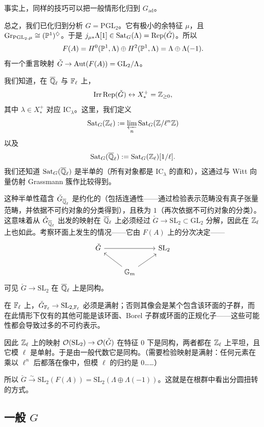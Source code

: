 \begin{remark}
事实上，同样的技巧可以把一般情形化归到 $G_{\mathrm{ad}}$。
\end{remark}

总之，我们已化归到分析 $G=\mathrm{PGL}_2$。它有极小的余特征 $\mu$，且 $\mathrm{Gr}_{\mathrm{PGL}_2,\mu}\cong(\mathbb{P}^1)^{\diamondsuit}$。于是 $j_{\mu*}\Lambda[1]\in\mathrm{Sat}_G(\Lambda)=\operatorname{Rep}(\check G)$。所以
\[
F(A)=H^0(\mathbb{P}^1,\Lambda)\oplus H^2(\mathbb{P}^1,\Lambda)=\Lambda\oplus\Lambda(-1).
\]
有一个重言映射 $\check G\to\operatorname{Aut}(F(A))=\mathrm{GL}_2/\Lambda$。


我们知道，在 $\overline{\mathbb{Q}}_\ell$ 与 $\mathbb{F}_\ell$ 上，
\[
\mathrm{Irr}\operatorname{Rep}(\check G)\leftrightarrow X^+_*=\mathbb{Z}_{\ge0},
\]
其中 $\lambda\in X^+_*$ 对应 $\mathrm{IC}_\lambda$。这里，我们定义
\[
\mathrm{Sat}_G(\mathbb{Z}_\ell):=\varprojlim_n\mathrm{Sat}_G(\mathbb{Z}/\ell^n\mathbb{Z})
\]
以及
\[
\mathrm{Sat}_G(\overline{\mathbb{Q}}_\ell):=\mathrm{Sat}_G(\mathbb{Z}_\ell)[1/\ell].
\]
我们还知道 $\mathrm{Sat}_G(\overline{\mathbb{Q}}_\ell)$ 是半单的（所有对象都是 $\mathrm{IC}_\lambda$ 的直和），这通过与 Witt 向量仿射 Grassmann 簇作比较得到。

这种半单性蕴含 $\check G_{\overline{\mathbb{Q}}_\ell}$ 是约化的（包括连通性——通过检验表示范畴没有真子张量范畴，并依据不可约对象的分类得到），且秩为 $1$（再次依据不可约对象的分类）。这意味着从 $\check G_{\overline{\mathbb{Q}}_\ell}$ 出发的映射在 $\overline{\mathbb{Q}}_\ell$ 上必须经过 $\check G\to\mathrm{SL}_2\subset\mathrm{GL}_2$ 分解，因此在 $\mathbb{Z}_\ell$ 上也如此。考察环面上发生的情况——它由 $F(A)$ 上的分次决定——
\[
\begin{tikzcd}
\check G \arrow[rr] & & \mathrm{SL}_2 \\
& \GG_m \arrow[ul] \arrow[ur] &
\end{tikzcd}
\]
可见 $\check G\to\mathrm{SL}_2$ 在 $\overline{\mathbb{Q}}_\ell$ 上是同构。

在 $\mathbb{F}_\ell$ 上，$\check G_{\mathbb{F}_\ell}\to\mathrm{SL}_{2,\mathbb{F}_\ell}$ 必须是满射；否则其像会是某个包含该环面的子群，而在此情形下仅有的其他可能是该环面、Borel 子群或环面的正规化子——这些可能性都会导致过多的不可约表示。

因此 $\mathbb{Z}_\ell$ 上的映射 $\mathcal{O}(\mathrm{SL}_2)\to\mathcal{O}(\check G)$ 在特征 $0$ 下是同构，两者都在 $\mathbb{Z}_\ell$ 上平坦，且它模 $\ell$ 是单射。于是由一般代数它是同构。（需要检验映射是满射：任何元素在乘以 $\ell^n$ 后都落在像中，但模 $\ell$ 的归约是 $0$……）

所以 $\check G\xrightarrow{\sim}\mathrm{SL}_2(F(A))=\mathrm{SL}_2(\Lambda\oplus\Lambda(-1))$。这就是在根群中看出分圆扭转的方式。

\subsection{一般 $G$}

